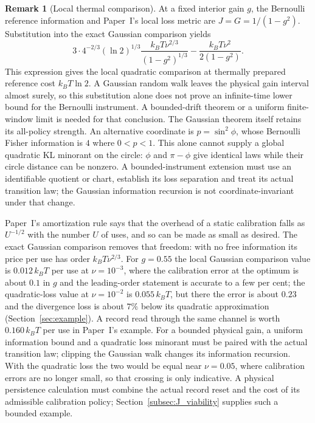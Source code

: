 \documentclass[12pt]{article}
\theoremstyle{definition}
\newtheorem{remark}[theorem]{Remark}
\begin{document}
\begin{remark}[Local thermal comparison]
\label{cor:thermo}
At a fixed interior gain $g$, the Bernoulli reference information and Paper~I's local loss metric are $J=G=1/(1-g^2)$. Substitution into the exact Gaussian comparison yields
\begin{equation}\label{eq:thermo_floor}
3\cdot4^{-2/3}(\ln2)^{1/3}\frac{k_BT\nu^{2/3}}{(1-g^2)^{1/3}}
-\frac{k_BT\nu^2}{2(1-g^2)}.
\end{equation}
This expression gives the local quadratic comparison at thermally prepared reference cost $k_BT\ln2$. A Gaussian random walk leaves the physical gain interval almost surely, so this substitution alone does not prove an infinite-time lower bound for the Bernoulli instrument. A bounded-drift theorem or a uniform finite-window limit is needed for that conclusion. The Gaussian theorem itself retains its all-policy strength.
An alternative coordinate is $p=\sin^2\phi$, whose Bernoulli Fisher
information is $4$ where $0<p<1$. This alone cannot supply a global
quadratic KL minorant on the circle: $\phi$ and $\pi-\phi$ give identical
laws while their circle distance can be nonzero. A bounded-instrument
extension must use an identifiable quotient or chart, establish its
loss separation and treat its actual transition law; the Gaussian
information recursion is not coordinate-invariant under that change.
\end{remark}

Paper~I's amortization rule says that the overhead of a static calibration falls as $U^{-1/2}$ with the number $U$ of uses, and so can be made as small as desired. The exact Gaussian comparison removes that freedom: with no free information its price per use has order $k_BT\nu^{2/3}$. For $g=0.55$ the local Gaussian comparison value is $0.012\,k_BT$ per use at $\nu=10^{-3}$, where the calibration error at the optimum is about $0.1$ in $g$ and the leading-order statement is accurate to a few per cent; the quadratic-loss value at $\nu=10^{-2}$ is $0.055\,k_BT$, but there the error is about $0.23$ and the divergence loss is about $7\%$ below its quadratic approximation (Section~\ref{sec:example}). A record read through the same channel is worth $0.160\,k_BT$ per use in Paper~I's example. For a bounded physical gain, a uniform information bound and a quadratic loss minorant must be paired with the actual transition law; clipping the Gaussian walk changes its information recursion. With the quadratic loss the two would be equal near $\nu=0.05$, where calibration errors are no longer small, so that crossing is only indicative. A physical persistence calculation must combine the actual record reset and the cost of its admissible calibration policy; Section~\ref{subsec:J_viability} supplies such a bounded example.
\end{document}
